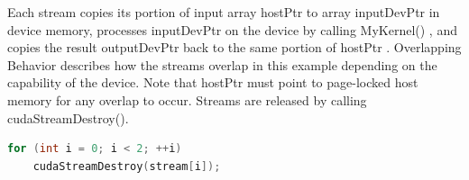 	Each stream copies its portion of input array hostPtr to array inputDevPtr in device
	memory, processes inputDevPtr on the device by calling MyKernel() , and copies
	the result outputDevPtr back to the same portion of hostPtr . Overlapping Behavior
	describes how the streams overlap in this example depending on the capability of the
	device. Note that hostPtr must point to page-locked host memory for any overlap to
	occur.
	Streams are released by calling cudaStreamDestroy().
	\begin{lstlisting}[language=C++]
	for (int i = 0; i < 2; ++i)
	cudaStreamDestroy(stream[i]);
	\end{lstlisting}
	


	
